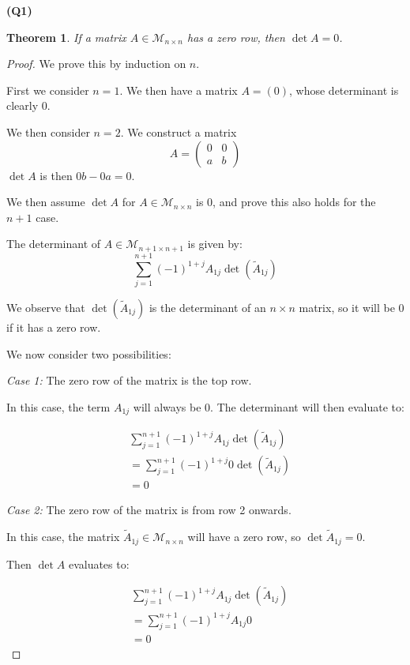 \documentclass[12pt, a4paper]{article}
\newtheorem*{theorem}{Theorem}
\begin{document}
\textbf{(Q1)}
\begin{theorem}
    If a matrix $A \in \mathcal{M}_{n \times n}$ has a zero row, then
    $\det A = 0$.
\end{theorem}
\begin{proof}
    We prove this by induction on $n$.

    First we consider $n = 1$. We then have a matrix $A = (0)$, whose
    determinant is clearly 0.

    We then consider $n = 2$. We construct a matrix
    \[
        A = \begin{pmatrix}
            0 & 0 \\
            a & b
        \end{pmatrix}
    \]
    $\det A$ is then $0b - 0a = 0$.

    We then assume $\det A$ for $A \in \mathcal{M}_{n \times n}$ is 0, and
    prove this also holds for the $n + 1$ case.

    The determinant of $A \in \mathcal{M}_{n + 1 \times n + 1}$ is given by:
    \[
        \sum_{j = 1}^{n + 1} (-1)^{1 + j} A_{1j} \det (\tilde{A}_{1j})
    \]

    We observe that $\det (\tilde{A}_{1j})$ is the determinant of an $n \times n$
    matrix, so it will be 0 if it has a zero row.

    We now consider two possibilities:

    \textit{Case 1:} The zero row of the matrix is the top row.

    In this case, the term $A_{1j}$ will always be 0.
    The determinant will then evaluate to:

    \begin{align*}
        & \sum_{j = 1}^{n + 1} (-1)^{1 + j} A_{1j} \det (\tilde{A}_{1j})\\
        & = \sum_{j = 1}^{n + 1} (-1)^{1 + j} 0 \det (\tilde{A}_{1j})\\
        & = 0
    \end{align*}

    \textit{Case 2:} The zero row of the matrix is from row 2 onwards.

    In this case, the matrix $\tilde{A}_{1j} \in \mathcal{M}_{n \times n}$ 
    will have a zero row,
    so $\det \tilde{A}_{1j} = 0$.

    Then $\det A$ evaluates to:

    \begin{align*}
        & \sum_{j = 1}^{n + 1} (-1)^{1 + j} A_{1j} \det (\tilde{A}_{1j})\\
        & = \sum_{j = 1}^{n + 1} (-1)^{1 + j} A_{1j} 0\\
        & = 0
    \end{align*}
\end{proof}
\end{document}

